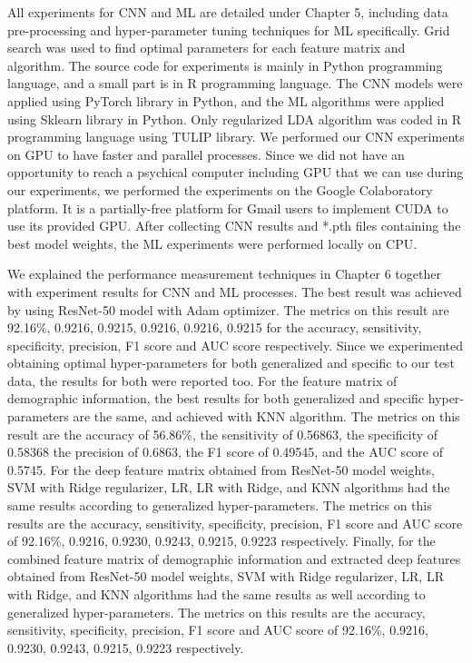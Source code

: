 All experiments for CNN and ML are detailed under Chapter 5, including data pre-processing and hyper-parameter tuning techniques for ML specifically. Grid search was used to find optimal parameters for each feature matrix and algorithm. The source code for experiments is mainly in Python programming language, and a small part is in R programming language. The CNN models were applied using PyTorch library in Python, and the ML algorithms were applied using Sklearn library in Python. Only regularized LDA algorithm was coded in R programming language using TULIP library. We performed our CNN experiments on GPU to have faster and parallel processes. Since we did not have an opportunity to reach a psychical computer including GPU that we can use during our experiments, we performed the experiments on the Google Colaboratory platform. It is a partially-free platform for Gmail users to implement CUDA to use its provided GPU. After collecting CNN results and *.pth files containing the best model weights, the ML experiments were performed locally on CPU.

We explained the performance measurement techniques in Chapter 6 together with experiment results for CNN and ML processes. The best result was achieved by using ResNet-50 model with Adam optimizer. The metrics on this result are 92.16\%, 0.9216, 0.9215, 0.9216, 0.9216, 0.9215 for the accuracy, sensitivity, specificity, precision, F1 score and AUC score respectively. Since we experimented obtaining optimal hyper-parameters for both generalized and specific to our test data, the results for both were reported too. For the feature matrix of demographic information, the best results for both generalized and specific hyper-parameters are the same, and achieved with KNN algorithm. The metrics on this result are the accuracy of 56.86\%, the sensitivity of 0.56863, the specificity of 0.58368 the precision of 0.6863, the F1 score of 0.49545, and the AUC score of 0.5745. For the deep feature matrix obtained from ResNet-50 model weights, SVM with Ridge regularizer, LR, LR with Ridge, and KNN algorithms had the same results according to generalized hyper-parameters. The metrics on this results are the accuracy, sensitivity, specificity, precision, F1 score and AUC score of 92.16\%, 0.9216, 0.9230, 0.9243, 0.9215, 0.9223 respectively. Finally, for the combined feature matrix of demographic information and extracted deep features obtained from ResNet-50 model weights, SVM with Ridge regularizer, LR, LR with Ridge, and KNN algorithms had the same results as well according to generalized hyper-parameters. The metrics on this results are the accuracy, sensitivity, specificity, precision, F1 score and AUC score of 92.16\%, 0.9216, 0.9230, 0.9243, 0.9215, 0.9223 respectively.

